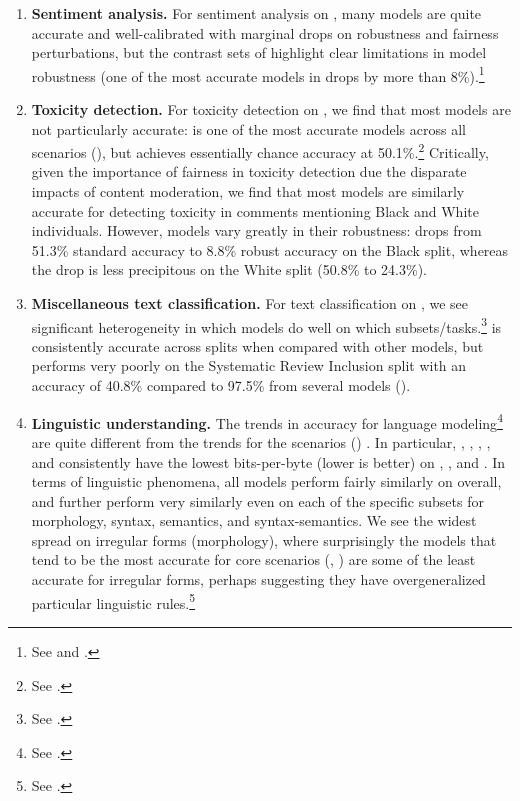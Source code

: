 \begin{enumerate}
    \item \textbf{Sentiment analysis.}
    For sentiment analysis on \imdb, many models are quite accurate and well-calibrated with marginal drops on robustness and fairness perturbations, but the contrast sets of \citet{gardner2020contrast} highlight clear limitations in model robustness (\eg one of the most accurate models in \glm drops by more than 8\%).\footnote{See  and .} 
    
    \item \textbf{Toxicity detection.}
    For toxicity detection on \civilcomments, we find that most models are not particularly accurate: \optonesevenfive is one of the most accurate models across all scenarios (), but achieves essentially chance accuracy at 50.1\%.\footnote{See .}
    Critically, given the importance of fairness in toxicity detection due the disparate impacts of content moderation, we find that most models are similarly accurate for detecting toxicity in comments mentioning Black and White individuals.
    However, models vary greatly in their robustness: \optonesevenfive drops from 51.3\% standard accuracy to 8.8\% robust accuracy on the Black split, whereas the drop is less precipitous on the White split (50.8\% to 24.3\%). 
    
    \item \textbf{Miscellaneous text classification.}
    For text classification on \raft, we see significant heterogeneity in which models do well on which subsets/tasks.\footnote{See .}
    \instructdavinci is consistently accurate across splits when compared with other models, but performs very poorly on the Systematic Review Inclusion split with an accuracy of 40.8\% compared to 97.5\% from several models (\eg \glm). 
    
    \item \textbf{Linguistic understanding.}
    The trends in accuracy for language modeling\footnote{See .} are quite different from the trends for the \core scenarios () .
    In particular, \gptneox, \optonesevenfive, \bloom, \gptj, and \optsixsix consistently have the lowest bits-per-byte (lower is better) on \pile, \twitteraae, and \ice. 
    In terms of linguistic phenomena, all models perform fairly similarly on \blimp overall, and further perform very similarly even on each of the specific subsets for morphology, syntax, semantics, and syntax-semantics.
    We see the widest spread on irregular forms (morphology), where surprisingly the models that tend to be the most accurate for core scenarios (\ie \instructdavinci, \mtnlgfivethreezero) are some of the least accurate for irregular forms, perhaps suggesting they have overgeneralized particular linguistic rules.\footnote{See .}
    

\end{enumerate}
